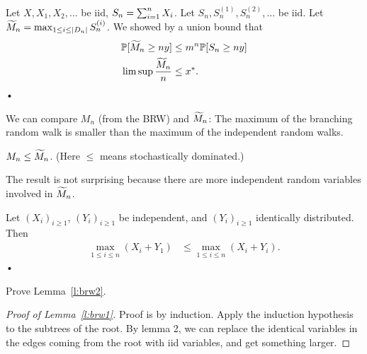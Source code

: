 \begin{rem}
Let $X,X_1,X_2,\ldots $ be iid, $S_n=\sum_{i=1}^{n} X_i$. Let $S_n, S_n^{(1)},S_n^{(2)},\ldots$ be iid. Let $\widetilde{M}_n = \max_{1\le i\le |D_n|} S_n^{(i)}$. We showed by a union bound that %
\begin{align*}
\mathbb{P}[\widetilde{M}_n \ge ny] &\le m^n \mathbb{P}[S_n\ge ny]\\
\limsup \frac{\widetilde{M}_n}{n} &\le x^*.
\end{align*}•
\end{rem}
We can compare $M_n$ (from the BRW) and $\widetilde{M}_n$: The maximum of the branching random walk is smaller than the maximum of the independent random walks.
\begin{lem}\label{l:brw1}
$M_n\le \widetilde{M}_n$. (Here $\le$ means stochastically dominated.)
\end{lem}
The result is not surprising because there are more independent random variables involved in $\widetilde{M}_n$.
\begin{lem}\label{l:brw2}
Let $(X_i)_{i\ge 1}$, $(Y_i)_{i\ge 1}$ be independent, and $(Y_i)_{i\ge 1}$ identically distributed. Then %
\begin{align*}
\max_{1\le i\le n}(X_i + Y_1) &\le \max_{1\le i\le n}(X_i+Y_i).
\end{align*}•
\end{lem}
\begin{exr}
Prove Lemma~\ref{l:brw2}.
\end{exr}
\begin{proof}[Proof of Lemma~\ref{l:brw1}]
Proof is by induction. 
Apply the induction hypothesis to the subtrees of the root. By lemma 2, we can replace the identical variables in the edges coming from the root with iid variables, and get something larger.
\end{proof}
